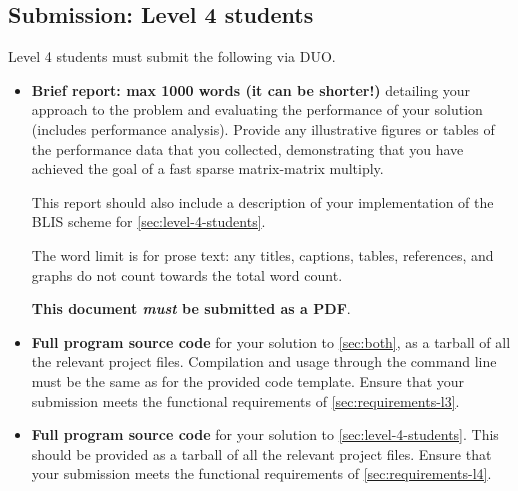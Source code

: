 \documentclass[a4paper]{article}
\begin{document}
\subsection{Submission: Level 4 students}
\label{sec:submission-level-4}

Level 4 students must submit the following via DUO.
\begin{itemize}
\item \textbf{Brief report: max 1000 words (it can be shorter!)}
  detailing your approach to the problem and evaluating the
  performance of your solution (includes performance analysis).
  Provide any illustrative figures or tables of the performance data
  that you collected, demonstrating that you have achieved the goal of
  a fast sparse matrix-matrix multiply.

  This report should also include a description of your implementation
  of the BLIS scheme for \cref{sec:level-4-students}.

  The word limit is for prose text: any titles, captions, tables,
  references, and graphs do not count towards the total word count.

  \textbf{This document \emph{must} be submitted as a PDF}.

\item \textbf{Full program source code} for your solution to
  \cref{sec:both}, as a tarball of all the relevant project files.
  Compilation and usage through the command line must be the same as
  for the provided code template.  Ensure that your submission meets
  the functional requirements of \cref{sec:requirements-l3}.

\item \textbf{Full program source code} for your solution to
  \cref{sec:level-4-students}.  This should be provided as a tarball
  of all the relevant project files.  Ensure that your submission
  meets the functional requirements of \cref{sec:requirements-l4}.
\end{itemize}
\printbibliography
\end{document}
